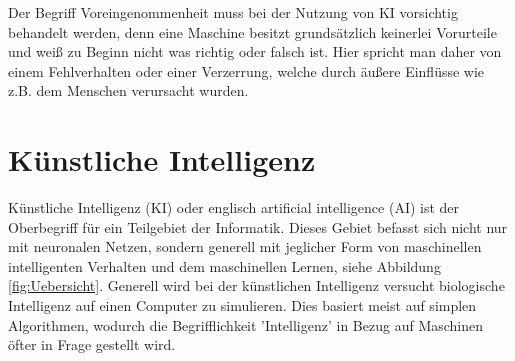 \documentclass[12pt,oneside,a4paper,parskip]{scrbook}
\begin{document}
Der Begriff Voreingenommenheit muss bei der Nutzung von KI vorsichtig behandelt werden, denn eine Maschine besitzt grundsätzlich keinerlei Vorurteile und weiß zu Beginn nicht was richtig oder falsch ist. Hier spricht man daher von einem Fehlverhalten oder einer Verzerrung, welche durch äußere Einflüsse wie z.B. dem Menschen verursacht wurden.\\

\section{Künstliche Intelligenz}
Künstliche Intelligenz (KI) oder englisch artificial intelligence (AI) ist der Oberbegriff für ein Teilgebiet der Informatik. Dieses Gebiet befasst sich nicht nur mit neuronalen Netzen, sondern generell mit jeglicher Form von maschinellen intelligenten Verhalten und dem maschinellen Lernen, siehe Abbildung \ref{fig:Uebersicht}. Generell wird bei der künstlichen Intelligenz versucht biologische Intelligenz auf einen Computer zu simulieren. Dies basiert meist auf simplen Algorithmen, wodurch die Begrifflichkeit 'Intelligenz' in Bezug auf Maschinen öfter in Frage gestellt wird.
\end{document}
